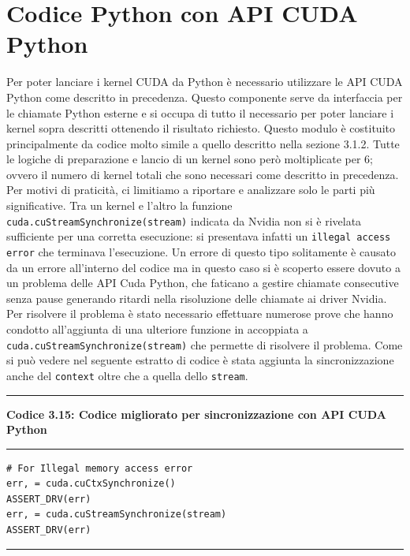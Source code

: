 \documentclass[12pt,a4paper]{report}
\begin{document}
{\section{Codice Python con API CUDA Python}
Per poter lanciare i kernel CUDA da Python è necessario utilizzare le API CUDA Python come descritto in precedenza. \newline
Questo componente serve da interfaccia per le chiamate Python esterne e si occupa di tutto il necessario per poter lanciare i kernel sopra descritti ottenendo il risultato richiesto. \newline
Questo modulo è costituito principalmente da codice molto simile a quello descritto nella sezione 3.1.2. Tutte le logiche di preparazione e lancio di un kernel sono però moltiplicate per 6; ovvero il numero di kernel totali che sono necessari come descritto in precedenza. \newline
Per motivi di praticità, ci limitiamo a riportare e analizzare solo le parti più significative. \newline \newline
Tra un kernel e l'altro la funzione \verb|cuda.cuStreamSynchronize(stream)| indicata da Nvidia non si è rivelata sufficiente per una corretta esecuzione: si presentava infatti un \verb|illegal access error| che terminava l'esecuzione. Un errore di questo tipo solitamente è causato da un errore all'interno del codice ma in questo caso si è scoperto essere dovuto a un problema delle API Cuda Python, che faticano a gestire chiamate consecutive senza pause generando ritardi nella risoluzione delle chiamate ai driver Nvidia.
Per risolvere il problema è stato necessario effettuare numerose prove che hanno condotto all'aggiunta di una ulteriore funzione in accoppiata a \verb|cuda.cuStreamSynchronize(stream)| che permette di risolvere il problema. Come si può vedere nel seguente estratto di codice è stata aggiunta la sincronizzazione anche del \verb|context| oltre che a quella dello \verb|stream|. \\[10pt]
\noindent\rule[0.5ex]{\linewidth}{2pt}
\small{\textbf{Codice 3.15: Codice migliorato per sincronizzazione con API CUDA Python}} \\
\noindent\rule[0.5ex]{\linewidth}{1pt}
\begin{lstlisting}
# For Illegal memory access error
err, = cuda.cuCtxSynchronize()
ASSERT_DRV(err)
err, = cuda.cuStreamSynchronize(stream)
ASSERT_DRV(err)
\end{lstlisting}
\noindent\rule[0.5ex]{\linewidth}{1pt} \\[10pt]

}
\end{document}
